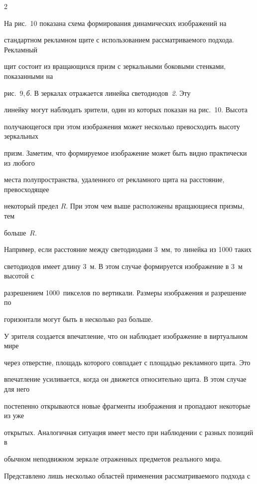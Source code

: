 \begin{multicols}{2}
  

  На рис.~10 показана схема формирования динамических изображений на 

стандартном рекламном щите с использованием рассматриваемого подхода. Рекламный 

щит состоит из вращающихся призм с зеркальными боковыми стенками, показанными на 

рис.~9,\,\textit{б}. В зеркалах отражается линейка светодиодов~\textit{2}. Эту 

линейку могут наблюдать зрители, один из которых показан на рис.~10. Высота 

получающегося при этом изображения может несколько превосходить высоту зеркальных 

призм. Заметим, что формируемое изображение может быть видно практически из любого 

места полупространства, удаленного от рекламного щита на расстояние, превосходящее 

некоторый предел $R$. При этом чем выше расположены вращающиеся призмы, тем 

больше~$R$. 

  



  

  Например, если расстояние между светодиодами 3~мм, то линейка из 1000 таких 

светодиодов имеет длину 3~м. В этом случае формируется изображение в 3~м высотой с 

разрешением 1000~пикселов по вертикали. Размеры изображения и разрешение по 

горизонтали могут быть в несколько раз больше. 

  

  У зрителя создается впечатление, что он наблюдает изображение в виртуальном мире 

через отверстие, площадь которого совпадает с площадью рекламного щита. Это 

впечатление усиливается, когда он движется относительно щита. В этом случае для него 

постепенно открываются новые фрагменты изображения и пропадают некоторые из уже 

открытых. Аналогичная ситуация имеет место при наблюдении с разных позиций в 

обычном неподвижном зеркале отраженных предметов реального мира. 

  

  Представлено лишь несколько областей применения рассматриваемого подхода с 


\end{multicols}
